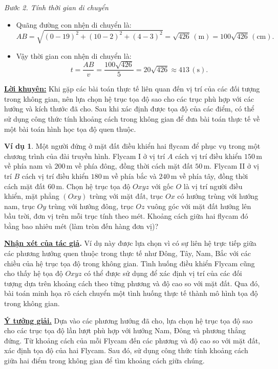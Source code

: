 \documentclass[12pt,a4paper,oneside]{book}
\theoremstyle{theorem}
\theoremstyle{definition}
\newtheorem{vd}[theorem2]{Ví dụ}
\begin{document}
        \noindent \textit{Bước 2. Tính thời gian di chuyển}
        \begin{itemize}
            \item Quãng đường con nhện di chuyển là:
            \[
            AB=\sqrt{(0-19)^2+(10-2)^2+(4-3)^2}
            =\sqrt{426}\,(\mathrm{m})
            =100\sqrt{426}\,(\mathrm{cm}).
            \]
        
            \item Vậy thời gian con nhện di chuyển là:
            \[
            t=\frac{AB}{v}
            =\frac{100\sqrt{426}}{5}
            =20\sqrt{426}\approx 413\,(\mathrm{s}).
            \]
        \end{itemize}
        \noindent \underline{\textbf{Lời khuyên:}} Khi gặp các bài toán thực tế liên quan đến vị trí của các đối tượng trong không gian, nên lựa chọn hệ trục tọa độ sao cho các trục phù hợp với các hướng và kích thước đã cho. Sau khi xác định được tọa độ của các điểm, có thể sử dụng công thức tính khoảng cách trong không gian để đưa bài toán thực tế về một bài toán hình học tọa độ quen thuộc.
        \begin{vd}
            Một người đứng ở mặt đất điều khiển hai flycam để phục vụ trong một chương trình của đài truyền hình. Flycam I ở vị trí $A$ cách vị trí điều khiển $150\,\mathrm{m}$ về phía nam và $200\,\mathrm{m}$ về phía đông, đồng thời cách mặt đất $50\,\mathrm{m}$. Flycam II ở vị trí $B$ cách vị trí điều khiển $180\,\mathrm{m}$ về phía bắc và $240\,\mathrm{m}$ về phía tây, đồng thời cách mặt đất $60\,\mathrm{m}$. Chọn hệ trục tọa độ $Oxyz$ với gốc $O$ là vị trí người điều khiển, mặt phẳng $(Oxy)$ trùng với mặt đất, trục $Ox$ có hướng trùng với hướng nam, trục $Oy$ trùng với hướng đông, trục $Oz$ vuông góc với mặt đất hướng lên bầu trời, đơn vị trên mỗi trục tính theo mét. Khoảng cách giữa hai flycam đó bằng bao nhiêu mét (làm tròn đến hàng đơn vị)?
        \end{vd}
        \noindent \textbf{\underline{Nhận xét của tác giả}.}
        Ví dụ này được lựa chọn vì có sự liên hệ trực tiếp giữa các phương hướng quen thuộc trong thực tế như Đông, Tây, Nam, Bắc với các chiều của hệ trục tọa độ trong không gian. Tình huống điều khiển Flycam cũng cho thấy hệ tọa độ $Oxyz$ có thể được sử dụng để xác định vị trí của các đối tượng dựa trên khoảng cách theo từng phương và độ cao so với mặt đất. Qua đó, bài toán minh họa rõ cách chuyển một tình huống thực tế thành mô hình tọa độ trong không gian.
        
        \noindent \textbf{\underline{Ý tưởng giải.}}
        Dựa vào các phương hướng đã cho, lựa chọn hệ trục tọa độ sao cho các trục tọa độ lần lượt phù hợp với hướng Nam, Đông và phương thẳng đứng. Từ khoảng cách của mỗi Flycam đến các phương và độ cao so với mặt đất, xác định tọa độ của hai Flycam. Sau đó, sử dụng công thức tính khoảng cách giữa hai điểm trong không gian để tìm khoảng cách giữa chúng.
        
\end{document}

